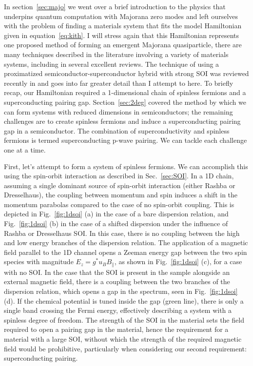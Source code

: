 In section~\ref{sec:majo} we went over a brief introduction to the physics that underpins quantum computation with Majorana zero modes
and left ourselves with the problem of finding a materials system that fits the model Hamiltonian given in equation~\ref{eq:kith}. I will stress
again that this Hamiltonian represents one proposed method of forming an emergent Majorana quasiparticle, there are many techniques described
in the literature involving a variety of materials systems, including in several excellent reviews\cite{RevModPhys.83.1057,doi:10.1146/030212-184337,Leijnse_2012,
RevModPhys.87.137,npjqi.2015.1,Aguado:2017ofc}. The technique of using a proximatized semiconductor-superconductor hybrid with strong SOI was reviewed
recently in \cite{s41578-018-0003-1} and goes into far greater detail than I attempt to here. To briefly recap, our Hamiltonian required a 1-dimensional
chain of spinless fermions and a superconducting pairing gap. Section~\ref{sec:2deg} covered the method by which we
can form systems with reduced dimensions in semiconductors; the remaining challenges are to create spinless fermions and induce a superconducting pairing gap
in a semiconductor. The combination of superconductivity and spinless fermions is termed superconducting p-wave pairing\cite{Kitaev_2001}. We can tackle
each challenge one at a time.

First, let's attempt to form a system of spinless fermions. We can accomplish this using the spin-orbit interaction as described in
Sec.~\ref{sec:SOI}. In a 1D chain, assuming a single dominant source of spin-orbit interaction (either Rashba or Dresselhaus), the coupling between momentum
and spin induces a shift in the momentum parabolas compared to the case of no spin-orbit coupling. This is depicted in Fig.~\ref{fig:1dsoi} (a) in the case of a bare
dispersion relation, and Fig.~\ref{fig:1dsoi} (b) in the case of a shifted dispersion under the influence of Rashba or Dresselhaus SOI. In this case, there is
no coupling between the high and low energy branches of the dispersion relation. The application of a magnetic field parallel to the 1D channel opens a Zeeman energy
gap between the two spin species with magnitude $E_z = g^* u_B B_\parallel$, as shown in Fig.~\ref{fig:1dsoi} (c), for a case with no SOI. In the case that the
SOI is present in the sample alongside an external magnetic field, there is a coupling between the two branches of the dispersion relation, which opens a gap in the
spectrum, seen in Fig.~\ref{fig:1dsoi} (d). If the chemical
potential is tuned inside the gap (green line), there is only a single band crossing the Fermi energy, effectively describing a system with a spinless degree of freedom.
The strength of the SOI in the material sets the field required to open a pairing gap in the material, hence the requirement for a material with a large SOI, without
which the strength of the required magnetic field would be prohibitive, particularly when considering our second requirement: superconducting pairing.

